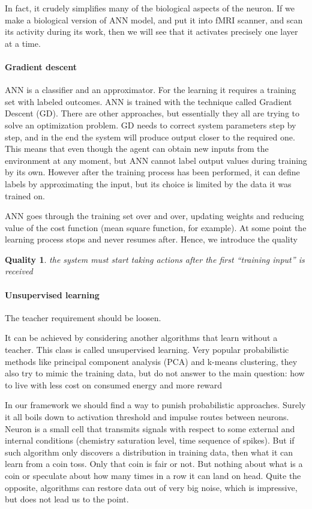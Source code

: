 \documentclass[draft]{article}
\newtheorem{Qual}{Quality}
\begin{document}
In fact, it crudely simplifies many of the biological aspects of the neuron. If we make a biological version of ANN model, and put it into fMRI scanner, and scan its activity during its work, then we will see that it activates precisely one layer at a time.

\paragraph{Gradient descent}
ANN is a classifier and an approximator. 
For the learning it requires a training set with labeled outcomes. 
ANN is trained with the technique called Gradient Descent (GD). There are other approaches, but essentially they all are trying to solve an optimization problem.
GD needs to correct system parameters step by step, and in the end the system will produce output closer to the required one.
This means that even though the agent can obtain new inputs from the environment at any moment, but ANN cannot label output values during training by its own. However after the training process has been performed, it can define labels by approximating the input, but its choice is limited by the data it was trained on.

ANN goes through the training set over and over, updating weights and reducing value of the cost function (mean square function, for example). At some point the learning process stops and never resumes after. Hence, we introduce the quality 

\begin{Qual}\label{q1}
the system must start taking actions after the first “training input” is received
\end{Qual}

\paragraph{Unsupervised learning}
The teacher requirement should be loosen. 

It can be achieved by considering another algorithms that learn without a teacher. This class is called unsupervised learning. Very popular probabilistic methods like principal component analysis (PCA) and k-means clustering, they also try to mimic the training data, but do not answer to the main question: how to live with less cost on consumed energy and more reward

In our framework we should find a way to punish probabilistic approaches. Surely it all boils down to activation threshold and impulse routes between neurons.
Neuron is a small cell that transmits signals with respect to some external and internal conditions (chemistry saturation level, time sequence of spikes). But if such algorithm only discovers a distribution in training data, then what it can learn from a coin toss. Only that coin is fair or not. But nothing about what is a coin or speculate about how many times in a row it can land on head. Quite the opposite, algorithms can restore data out of very big noise, which is impressive, but does not lead us to the point.
\end{document}
